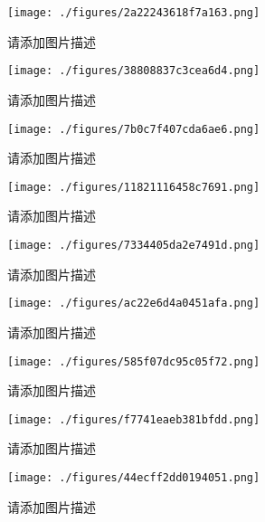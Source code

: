 
\begin{issues}
\issueDraft
\end{issues}

\begin{figure}[ht]
\centering
\texttt{[image: ./figures/2a22243618f7a163.png]}
\caption{请添加图片描述} \label{fig_PhText_1}
\end{figure}

\begin{figure}[ht]
\centering
\texttt{[image: ./figures/38808837c3cea6d4.png]}
\caption{请添加图片描述} \label{fig_PhText_2}
\end{figure}

\begin{figure}[ht]
\centering
\texttt{[image: ./figures/7b0c7f407cda6ae6.png]}
\caption{请添加图片描述} \label{fig_PhText_3}
\end{figure}

\begin{figure}[ht]
\centering
\texttt{[image: ./figures/11821116458c7691.png]}
\caption{请添加图片描述} \label{fig_PhText_4}
\end{figure}

\begin{figure}[ht]
\centering
\texttt{[image: ./figures/7334405da2e7491d.png]}
\caption{请添加图片描述} \label{fig_PhText_5}
\end{figure}

\begin{figure}[ht]
\centering
\texttt{[image: ./figures/ac22e6d4a0451afa.png]}
\caption{请添加图片描述} \label{fig_PhText_6}
\end{figure}

\begin{figure}[ht]
\centering
\texttt{[image: ./figures/585f07dc95c05f72.png]}
\caption{请添加图片描述} \label{fig_PhText_7}
\end{figure}

\begin{figure}[ht]
\centering
\texttt{[image: ./figures/f7741eaeb381bfdd.png]}
\caption{请添加图片描述} \label{fig_PhText_8}
\end{figure}

\begin{figure}[ht]
\centering
\texttt{[image: ./figures/44ecff2dd0194051.png]}
\caption{请添加图片描述} \label{fig_PhText_9}
\end{figure}